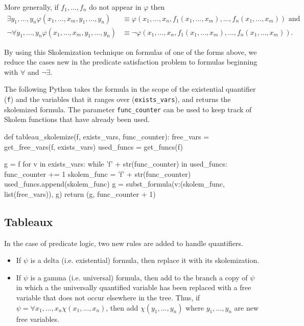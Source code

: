 \documentclass[a4paper,notitlepage]{scrartcl}
\let\phi\varphi
\begin{document}
More generally, if $f_1,...,f_n$ do not appear in $\phi$ then
\begin{align*}
\exists y_1,...,y_n\phi(x_1,...,x_m, y_1,...,y_n)
   &\equiv \phi(x_1,...,x_n, f_1(x_1,...,x_m),...,f_n(x_1,...,x_m))\text{ and}\\
\lnot\forall y_1,...,y_n\phi(x_1,...,x_m, y_1,...,y_n)
   &\equiv \lnot \phi(x_1,...,x_n, f_1(x_1,...,x_m),...,f_n(x_1,...,x_m)).
\end{align*}

By using this Skolemization technique on formulas of one of the
   forms above, we reduce the cases new in the predicate satisfaction
   problem to formulas beginning with $\forall$ and $\lnot\exists$. 

The following Python takes the formula in the scope of the 
   existential quantifier (\texttt{f}) and the variables that it ranges
   over (\texttt{exists\_vars}), and returns the skolemized formula.
The parameter \texttt{func\_counter} can be used to keep track of Skolem 
   functions that have already been used.

\begin{code}
def tableau_skolemize(f, exists_vars, func_counter):
    free_vars = get_free_vars(f, exists_vars)
    used_funcs = get_funcs(f)

    g = f
    for v in exists_vars:
        while 'f' + str(func_counter) in used_funcs:
            func_counter += 1
        skolem_func = 'f' + str(func_counter)
        used_funcs.append(skolem_func)
        g = subst_formula({v:(skolem_func, list(free_vars))}, g)
    return (g, func_counter + 1)
\end{code}

\subsection{Tableaux}

In the case of predicate logic, two new rules are added to handle quantifiers.

\begin{itemize}
\item
If $\psi$ is a delta (i.e. existential) formula, then replace it with its
skolemization.

\item
If $\psi$ is a gamma (i.e. universal) formula, then add to the branch a copy of
$\psi$ in which a the universally quantified variable has been replaced with a
free variable that does not occur elsewhere in the tree. Thus, if $\psi =
\forall x_1, \ldots, x_n \chi(x_1, \ldots, x_n)$, then add $\chi(y_1, \ldots,
y_n)$ where $y_1, \ldots, y_n$ are new free variables.
\end{itemize}
\end{document}
